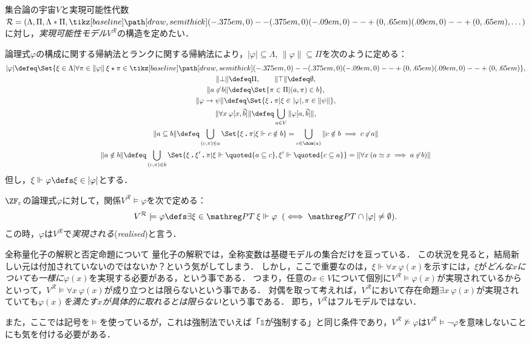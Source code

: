 \documentclass[realisability.tex]{subfiles}
\begin{document}
\begin{definition}[実現可能性モデル]
 集合論の宇宙$V$と実現可能性代数$\mathcal{R} = (\Lambda, \Pi, \Lambda \ast \Pi, \pole, \dots)$に対し，\emph{実現可能性モデル}$V^{\mathcal{R}}$の構造を定めたい．

 論理式$\varphi$の構成に関する帰納法とランクに関する帰納法により，$|\varphi| \subseteq \Lambda$, $\|\varphi\| \subseteq \Pi$を次のように定める：
 \begin{gather*}
  |\varphi| \defeq \Set{ \xi \in \Lambda | \forall \pi \in \|\varphi\| \: \xi \cons \pi \in \pole},\\
  \|\bot\| \defeq \Pi,\qquad \|\top\| \defeq \emptyset, \\
  \|a \strnin b\| \defeq \Set{ \pi \in \Pi | (a, \pi) \in b},\\
  \|\varphi \to \psi\| \defeq \Set{ \xi \push \pi | {\xi \in |\varphi|, \pi \in \|\psi\|}},\\
  \|\forall x \: \varphi[x, \vec{b}]\| \defeq \bigcup_{a \in V} \| \varphi[a, \vec{b}]\|,\\
  \| a \subseteq b \| \defeq \bigcup_{(c, \pi) \in a} \Set{ \xi \push \pi | \xi \Vdash c \notin b}
  = \bigcup_{c \in \dom(a)} \|c \notin b \implies c \strnin a\|\\
  \| a \notin b \| \defeq \bigcup_{(c, \pi) \in b} \Set{ \xi \push \xi' \push \pi | \xi \Vdash \quoted{a \subseteq c}, \xi' \Vdash \quoted{c \subseteq a}}
   = \|\forall x \: (a \simeq x \implies a \strnin b)\|
 \end{gather*}
 但し，$\xi \Vdash \varphi \defs \xi \in |\varphi|$とする．

 $\ZF_{\varepsilon}$の論理式$\varphi$に対して，関係$V^{\mathcal{R}} \models \varphi$を次で定める：
 \[
  V^{\mathcal{R}} \models \varphi \defs \exists \xi \in \PT\: \xi \Vdash \varphi \mathrel{}(\iff \PT \cap |\varphi| \neq \emptyset).
 \]
 この時，$\varphi$は$V^{\mathcal{R}}$で\emph{実現される}(\emph{realised})と言う．
\end{definition}

\begin{remark}{全称量化子の解釈と否定命題について}
 量化子の解釈では，全称変数は基礎モデルの集合だけを亘っている．
 この状況を見ると，結局新しい元は付加されていないのではないか？という気がしてしまう．
 しかし，ここで重要なのは，$\xi \Vdash \forall x \: \varphi(x)$を示すには，$\xi$が\emph{どんな$x$についても一様に}$\varphi(x)$を実現する必要がある，という事である．
 つまり，任意の$x \in V$について個別に$V^{\mathcal{R}} \models \varphi(x)$が実現されているからといって，$V^{\mathcal{R}} \models \forall x\: \varphi(x)$が成り立つとは限らないという事である．
 対偶を取って考えれば，$V^{\mathcal{R}}$において存在命題$\exists x \: \varphi(x)$が実現されていても\emph{$\varphi(x)$を満たす$x$が具体的に取れるとは限らない}という事である．
 即ち，$V^{\mathcal{R}}$はフルモデルではない．

 また，ここでは記号を$\models$を使っているが，これは強制法でいえば「$\mathds{1}$が強制する」と同じ条件であり，$V^{\mathcal{R}} \not\models \varphi$は$V^{\mathcal{R}} \models \neg \varphi$を意味しないことにも気を付ける必要がある．
\end{remark}
\end{document}
